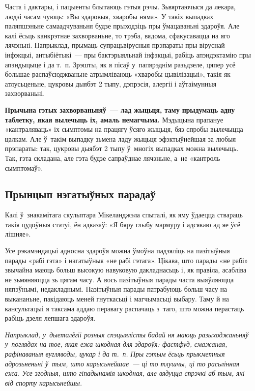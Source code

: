 Часта і дактары, і пацыенты блытаюць гэтыя рэчы. Зьвяртаючыся да лекара, людзі часам чуюць: «Вы здаровыя, хваробы няма». У такіх выпадках паляпшэньне самаадчуваньня будзе прыходзіць пры ўмацаваньні здароўя. Але калі ёсьць канкрэтнае захворваньне, то трэба, вядома, сфакусавацца на яго лячэньні. Напрыклад, прымаць супрацьвірусныя прэпараты пры віруснай інфэкцыі, антыбіётыкі~--- пры бактэрыяльнай інфэкцыі, рабіць апэндэктамію пры апэндыцыце і да т.~п. Зрэшты, як я пісаў у~папярэднім разьдзеле, цяпер усё большае распаўсюджваньне атрымліваюць «хваробы цывілізацыі», такія як атлусьценьне, цукровы дыябэт 2 тыпу, дэпрэсія, алергіі і аўтаімунныя захворваньні. 

\textbf{Прычына гэтых захворваньняў~--- лад жыцьця, таму прыдумаць адну таблетку, якая вылечыць іх, амаль немагчыма.} Мэдыцына прапануе «кантраляваць» іх сымптомы на працягу ўсяго жыцьця, бяз спробы вылечыцца цалкам. Але ў~такім выпадку зьмена ладу жыцьця эфэктыўнейшая за любыя прэпараты: так, цукровы дыябэт 2 тыпу ў~многіх выпадках можна вылечыць. Так, гэта складана, але гэта будзе сапраўднае лячэньне, а~не «кантроль сымптомаў».

\subsection*{Прынцып нэгатыўных парадаў} 

Калі ў~знакамітага скульптара Мікеланджэла спыталі, як яму ўдаецца ствараць такія цудоўныя статуі, ён адказаў: «Я бяру глыбу мармуру і адсякаю ад яе ўсё лішняе». 


Усе рэкамэндацыі адносна здароўя можна ўмоўна падзяліць на пазітыўныя парады «рабі гэта» і нэгатыўныя «не рабі гэтага». Цікава, што парады «не рабі» звычайна маюць больш высокую навуковую дакладнасьць і, як правіла, асабліва не зьмяняюцца зь цягам часу. А вось пазітыўныя парады часта выяўляюцца няпэўнымі, недакладнымі. Пазітыўныя парады патрабуюць больш часу на выкананьне, пакідаюць меней гнуткасьці і магчымасьці выбару. Таму й на кансультацыі я таксама аддаю перавагу распачаць з~таго, што можна перастаць рабіць дзеля лепшага здароўя.

\emph{Напрыклад, у~дыеталёгіі розныя спэцыялісты бадай ня маюць разыходжаньняў у~поглядах на тое, якая ежа шкодная для здароўя: фастфуд, смажаная, рафінаваныя вугляводы, цукар і да т.~п. Пры гэтым ёсьць прыкметныя адрозьненьні ў~тым, што карысьнейшае~--- ці то тлушчы, ці то расьлінная ежа. Усе згодныя, што гіпадынамія шкодная, але вядуцца спрэчкі аб тым, які від спорту карысьнейшы.}

